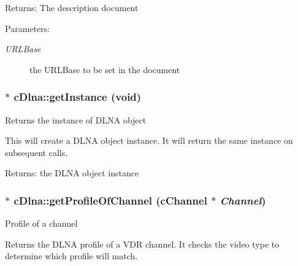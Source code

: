 \begin{Desc}
\item[Returns:]The description document \end{Desc}
\begin{Desc}
\item[Parameters:]
\begin{description}
\item[{\em URLBase}]the URLBase to be set in the document \end{description}
\end{Desc}
\hypertarget{classcDlna_1e30449831b903d508dae6640039fc25}{
\subsubsection[{getInstance}]{ $\ast$ cDlna::getInstance (void)}}
\label{classcDlna_1e30449831b903d508dae6640039fc25}


Returns the instance of DLNA object

This will create a DLNA object instance. It will return the same instance on subsequent calls.

\begin{Desc}
\item[Returns:]the DLNA object instance \end{Desc}
\hypertarget{classcDlna_4eacc299d19fa20beba98d88d4230388}{
\subsubsection[{getProfileOfChannel}]{ $\ast$ cDlna::getProfileOfChannel (cChannel $\ast$ {\em Channel})}}
\label{classcDlna_4eacc299d19fa20beba98d88d4230388}


Profile of a channel

Returns the DLNA profile of a VDR channel. It checks the video type to determine which profile will match.

